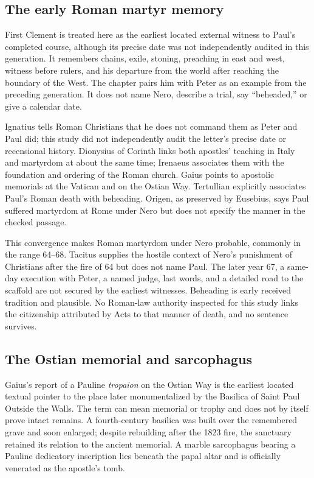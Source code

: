 \subsection{The early Roman martyr memory}

First Clement is treated here as the earliest located external witness to
Paul's completed course, although its precise date was not independently
audited in this generation. It remembers
chains, exile, stoning, preaching in east and west, witness before rulers, and
his departure from the world after reaching the boundary of the West. The
chapter pairs him with Peter as an example from the preceding generation. It
does not name Nero, describe a trial, say ``beheaded,'' or give a calendar
date.

Ignatius tells Roman Christians that he does not command them as Peter and
Paul did; this study did not independently audit the letter's precise date or
recensional history. Dionysius of Corinth links both
apostles' teaching in Italy and martyrdom at about the same time; Irenaeus
associates them with the foundation and ordering of the Roman church. Gaius
points to apostolic memorials at the Vatican and on the Ostian Way.
Tertullian explicitly associates Paul's Roman death with beheading. Origen,
as preserved by Eusebius, says Paul suffered martyrdom at Rome under Nero but
does not specify the manner in the checked passage.

This convergence makes Roman martyrdom under Nero probable, commonly in the
range 64--68. Tacitus supplies the hostile context of Nero's punishment of
Christians after the fire of 64 but does not name Paul. The later year 67, a
same-day execution with Peter, a named judge, last words, and a detailed road
to the scaffold are not secured by the earliest witnesses. Beheading is early
received tradition and plausible. No Roman-law authority inspected for this
study links the citizenship attributed by Acts to that manner of death, and no
sentence survives.

\subsection{The Ostian memorial and sarcophagus}

Gaius's report of a Pauline \emph{tropaion} on the Ostian Way is the earliest
located textual pointer to the place later monumentalized by the Basilica of
Saint Paul Outside the Walls. The term can mean memorial or trophy and does not
by itself prove intact remains. A fourth-century basilica was built over the
remembered grave and soon enlarged; despite rebuilding after the 1823 fire,
the sanctuary retained its relation to the ancient memorial. A marble
sarcophagus bearing a Pauline dedicatory inscription lies beneath the papal
altar and is officially venerated as the apostle's tomb.

